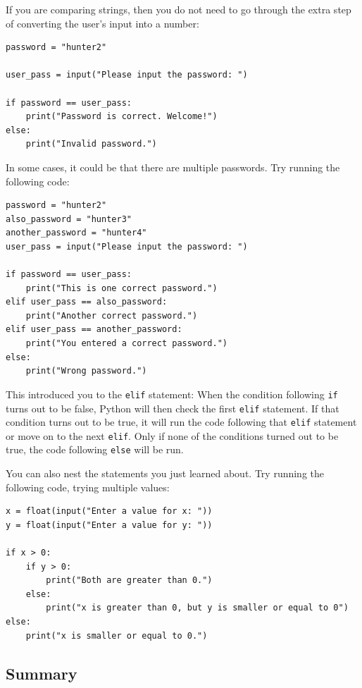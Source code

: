\documentclass[11pt,hidelinks]{article}
\begin{document}
If you are comparing strings, then you do not need to go through the extra step
of converting the user's input into a number:

\begin{lstlisting}[style=python]
password = "hunter2"

user_pass = input("Please input the password: ")

if password == user_pass:
    print("Password is correct. Welcome!")
else:
    print("Invalid password.")
\end{lstlisting}

In some cases, it could be that there are multiple passwords. Try running the
following code:
\begin{lstlisting}
password = "hunter2"
also_password = "hunter3"
another_password = "hunter4"
user_pass = input("Please input the password: ")

if password == user_pass:
    print("This is one correct password.")
elif user_pass == also_password:
    print("Another correct password.")
elif user_pass == another_password:
    print("You entered a correct password.")
else:
    print("Wrong password.")
\end{lstlisting}

This introduced you to the \lstinline!elif! statement: When the condition
following \lstinline!if! turns out to be false, Python will then check the first
\lstinline!elif! statement. If that condition turns out to be true, it will run
the code following that \lstinline!elif! statement or move on to the next
\lstinline!elif!. Only if none of the conditions turned out to be true, the code
following \lstinline!else! will be run.

You can also nest the statements you just learned about. Try running the
following code, trying multiple values:
\begin{lstlisting}
x = float(input("Enter a value for x: "))
y = float(input("Enter a value for y: "))

if x > 0:
    if y > 0:
        print("Both are greater than 0.")
    else:
        print("x is greater than 0, but y is smaller or equal to 0")
else:
    print("x is smaller or equal to 0.")
\end{lstlisting}

\subsection{Summary}
\end{document}
